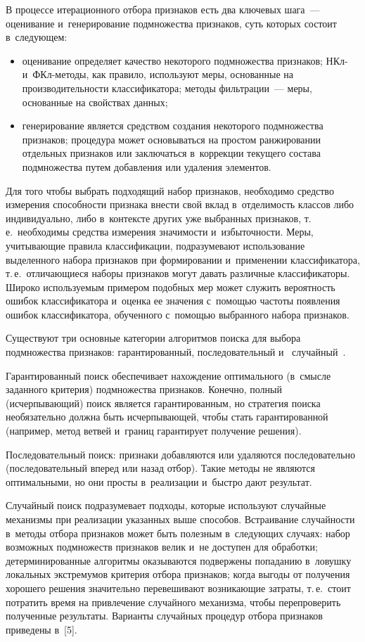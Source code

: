 \begin{multicols}{2}
     В процессе итерационного отбора признаков есть два ключевых шага~--- 
оценивание и~генерирование подмножества признаков, суть которых состоит 
в~следующем:
     \begin{itemize}
\item оценивание определяет качество некоторого подмножества признаков; 
НКл- и~ФКл-ме\-то\-ды, как правило, используют меры, основанные на 
производительности классификатора; методы фильтрации~--- меры, 
основанные на свойствах данных;
\item генерирование является средством создания некоторого подмножества 
признаков; процедура может основываться на простом ранжировании 
отдельных признаков или заключаться в~коррекции текущего состава 
подмножества путем добавления или удаления элементов.
\end{itemize}

     Для того чтобы выбрать подходящий набор признаков, необходимо 
средство измерения спо\-соб\-ности признака внести свой вклад в~отделимость 
классов либо индивидуально, либо в~контексте других уже выбранных 
признаков, т.\,е.\ необходимы средства измерения значимости и~из\-бы\-точ\-ности. 
Меры, учитывающие правила классификации, подразумевают использование 
выделенного набора признаков при формировании и~применении 
классификатора, т.\,е.\ отличающиеся наборы признаков могут давать 
различные классификаторы. Широко используемым примером подобных мер 
может служить вероятность ошибок классификатора и~оценка ее значения 
с~помощью частоты появления ошибок классификатора, обученного 
с~помощью выбранного набора признаков. 
     
     Существуют три основные категории алгоритмов поиска для выбора 
подмножества признаков: гарантированный, последовательный и~
случайный~\cite{2-kri}.
     
     Гарантированный поиск обеспечивает нахождение оптимального 
(в~смысле заданного критерия) подмножества признаков. Конечно, полный 
(исчерпывающий) поиск является гарантированным, но стратегия поиска 
необязательно должна быть исчерпывающей, чтобы стать гарантированной 
(например, метод ветвей и~границ гарантирует получение решения).
     
     Последовательный поиск: признаки добавляются или удаляются 
последовательно (последовательный вперед или назад отбор). Такие методы не 
являются оптимальными, но они просты в~реализации и~быстро дают результат.
     
     Случайный поиск подразумевает подходы, которые используют 
случайные механизмы при реализации указанных выше способов. Встраивание 
случайности в~методы отбора признаков может быть полезным в~следующих 
случаях: набор возможных подмножеств признаков велик и~не доступен для 
обработки; детерминированные алгоритмы оказываются подвержены 
попаданию в~ловушку локальных экстремумов критерия отбора признаков; 
когда выгоды от получения хорошего решения значительно перевешивают 
возникающие затраты, т.\,е.\ стоит потратить время на привлечение случайного 
механизма, чтобы перепроверить полученные результаты. Варианты случайных 
процедур отбора признаков приведены в~[5].
     

\end{multicols}

